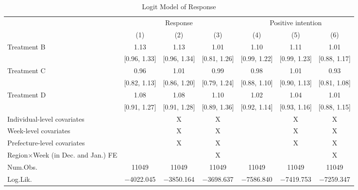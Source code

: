 \documentclass[12pt, a4paper]{article}
\begin{document}
\begin{table}[H]
\begin{threeparttable}
\begin{tablenotes}
\end{tablenotes}
\end{threeparttable}
\end{table}

\begin{landscape}\begin{table}[H]

\caption{\label{tab:reply-logit}Logit Model of Response}
\centering
\fontsize{8}{10}\selectfont
\begin{threeparttable}
\begin{tabular}[t]{lcccccc}
\toprule
\multicolumn{1}{c}{ } & \multicolumn{3}{c}{Response} & \multicolumn{3}{c}{Positive intention} \\
\cmidrule(l{3pt}r{3pt}){2-4} \cmidrule(l{3pt}r{3pt}){5-7}
  & (1) & (2) & (3) & (4) & (5) & (6)\\
\midrule
Treatment B & \num{1.13} & \num{1.13} & \num{1.01} & \num{1.10} & \num{1.11} & \num{1.01}\\
 & {}[\num{0.96}, \num{1.33}] & {}[\num{0.96}, \num{1.34}] & {}[\num{0.81}, \num{1.26}] & {}[\num{0.99}, \num{1.22}] & {}[\num{0.99}, \num{1.23}] & {}[\num{0.88}, \num{1.17}]\\
Treatment C & \num{0.96} & \num{1.01} & \num{0.99} & \num{0.98} & \num{1.01} & \num{0.93}\\
 & {}[\num{0.82}, \num{1.13}] & {}[\num{0.86}, \num{1.20}] & {}[\num{0.79}, \num{1.24}] & {}[\num{0.88}, \num{1.10}] & {}[\num{0.90}, \num{1.13}] & {}[\num{0.81}, \num{1.08}]\\
Treatment D & \num{1.08} & \num{1.08} & \num{1.10} & \num{1.02} & \num{1.04} & \num{1.01}\\
 & {}[\num{0.91}, \num{1.27}] & {}[\num{0.91}, \num{1.28}] & {}[\num{0.89}, \num{1.36}] & {}[\num{0.92}, \num{1.14}] & {}[\num{0.93}, \num{1.16}] & {}[\num{0.88}, \num{1.15}]\\
\midrule
Individual-level covariates &  & X & X &  & X & X\\
Week-level covariates &  & X & X &  & X & X\\
Prefecture-level covariates &  & X & X &  & X & X\\
Region$\times$Week (in Dec. and Jan.) FE &  &  & X &  &  & X\\
Num.Obs. & \num{11049} & \num{11049} & \num{11049} & \num{11049} & \num{11049} & \num{11049}\\
Log.Lik. & \num{-4022.045} & \num{-3850.164} & \num{-3698.637} & \num{-7586.840} & \num{-7419.753} & \num{-7259.347}\\

\end{tabular}
\end{threeparttable}
\end{table}
\end{landscape}
\end{document}
